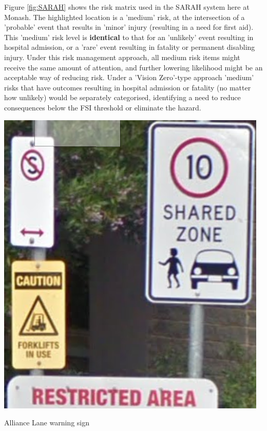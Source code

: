 \documentclass{tufte-handout}
\begin{document}
 Figure \ref{fig:SARAH} shows the risk matrix used in the SARAH system here at Monash.  The highlighted location is a 'medium' risk, at the intersection of a 'probable' event that results in 'minor' injury (resulting in a need for first aid).  This 'medium' risk level is \textbf{identical} to that for an 'unlikely' event resulting in hospital admission, or a 'rare' event resulting in fatality or permanent disabling injury. Under this risk management approach, all medium risk items might receive the same amount of attention, and further lowering likelihood might be an acceptable way of reducing risk.  Under a 'Vision Zero'-type approach 'medium' risks that have outcomes resulting in hospital admission or fatality (no matter how unlikely) would be separately categorised, identifying a need to reduce consequences below the FSI threshold or eliminate the hazard. 



\begin{marginfigure}
\includegraphics{Alliance_lane_forklifts}
\caption{Alliance Lane warning sign}
\label{fig:Alliance_lane_forklifts}
\end{marginfigure}
\end{document}
